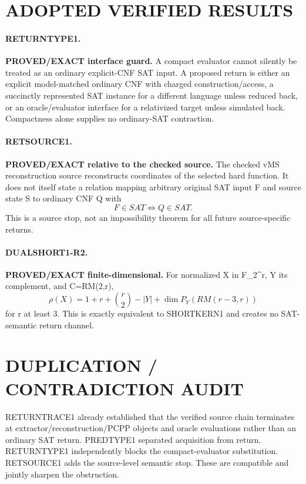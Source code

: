 \documentclass[11pt]{article}
\begin{document}
\section*{ADOPTED VERIFIED RESULTS}
\paragraph{RETURNTYPE1.}
\textbf{PROVED/EXACT interface guard.} A compact evaluator cannot silently be treated as an ordinary explicit-CNF SAT input. A proposed return is either an explicit model-matched ordinary CNF with charged construction/access, a succinctly represented SAT instance for a different language unless reduced back, or an oracle/evaluator interface for a relativized target unless simulated back. Compactness alone supplies no ordinary-SAT contraction.

\paragraph{RETSOURCE1.}
\textbf{PROVED/EXACT relative to the checked source.} The checked vMS reconstruction source reconstructs coordinates of the selected hard function. It does not itself state a relation mapping arbitrary original SAT input F and source state S to ordinary CNF Q with
\[
F\in SAT\iff Q\in SAT.
\]
This is a source stop, not an impossibility theorem for all future source-specific returns.

\paragraph{DUALSHORT1-R2.}
\textbf{PROVED/EXACT finite-dimensional.} For normalized X in F_2^r, Y its complement, and C=RM(2,r),
\[
\rho(X)=1+r+\binom r2-|Y|+\dim P_Y(RM(r-3,r))
\]
for r at least 3. This is exactly equivalent to SHORTKERN1 and creates no SAT-semantic return channel.

\section*{DUPLICATION / CONTRADICTION AUDIT}
RETURNTRACE1 already established that the verified source chain terminates at extractor/reconstruction/PCPP objects and oracle evaluations rather than an ordinary SAT return. PREDTYPE1 separated acquisition from return. RETURNTYPE1 independently blocks the compact-evaluator substitution. RETSOURCE1 adds the source-level semantic stop. These are compatible and jointly sharpen the obstruction.
\end{document}
